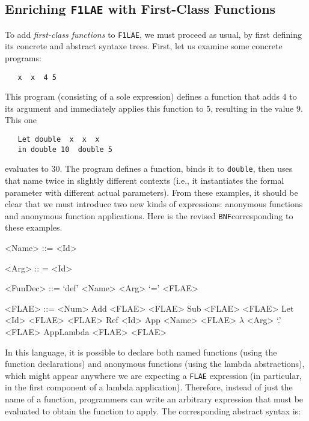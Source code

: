 \documentclass{book}
\newcommand{\bnf}{\texttt{BNF}}
\renewcommand{\emph}[1]{{\color{blue}\textit{#1}}}
\begin{document}
\subsection{Enriching \texttt{F1LAE} with First-Class Functions} 

To add \emph{first-class functions} to \texttt{F1LAE}, we must 
proceed as usual, by first defining its concrete and 
abstract syntaxe trees. First, let us examine some concrete programs: 

\begin{tabbing}\tt
~~x~~x~~4~5~
\end{tabbing}

\noindent This program (consisting of a sole expression) defines a function 
that adds $4$ to its argument and immediately applies this function 
to $5$, resulting in the value $9$. This one

\begin{tabbing}\tt
~~Let~double~~x~~x~~x~\\
\tt ~~~in~double~10~~double~5
\end{tabbing}

\noindent evaluates to $30$. The program defines a function, 
binds it to \texttt{double}, then uses that name twice in 
slightly different contexts (i.e., it instantiates the formal 
parameter with different actual parameters). From these 
examples, it should be clear that we must introduce two 
new kinds of expressions: anonymous functions and 
anonymous function applications. Here is the revised 
\bnf corresponding to these examples. 

\begin{grammar}
 <Name> ::= <Id>
 
 <Arg> :: = <Id> 

 <FunDec> ::= `def' <Name> <Arg> `=' <FLAE> 
 
 <FLAE> ::= <Num> 
     \alt Add <FLAE> <FLAE>
     \alt Sub <FLAE> <FLAE> 
     \alt Let <Id> <FLAE> <FLAE>
     \alt Ref <Id>
     \alt App <Name> <FLAE> 
     \alt $\lambda$ <Arg> `.' <FLAE>
     \alt AppLambda <FLAE> <FLAE> 
\end{grammar}

In this language, it is possible to declare 
both named functions (using the function declarations) 
and anonymous functions (using the lambda 
abstractions), which might appear anywhere we 
are expecting a \texttt{FLAE} expression (in particular, 
in the first component of a lambda application). Therefore, instead 
of just the name of a function, programmers can write an arbitrary 
expression that must be evaluated to obtain the function 
to apply. The corresponding abstract syntax is:
\end{document}
